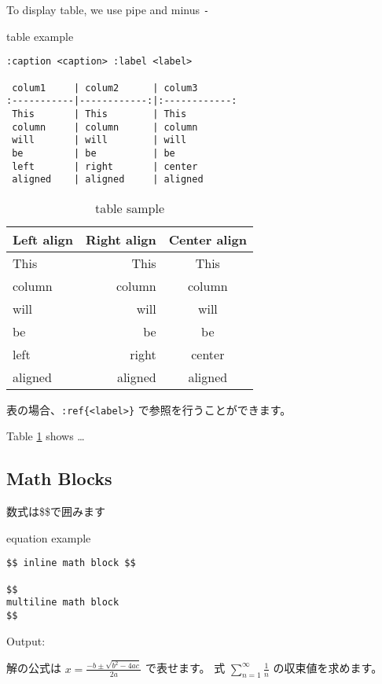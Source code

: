 \documentclass[a4j, titlepage]{jarticle}
\begin{document}
To display table, we use pipe {\tt \textbar{}} and minus {\tt -}

\begin{itembox}[c]{table example}
\begin{verbatim}
:caption <caption> :label <label>

 colum1     | colum2      | colum3
:-----------|------------:|:------------:
 This       | This        | This         
 column     | column      | column       
 will       | will        | will         
 be         | be          | be           
 left       | right       | center       
 aligned    | aligned     | aligned   
\end{verbatim}
\end{itembox}

\begin{table}[h]
\centering
\caption{table sample }
\label{table:1}
\begin{tabular}{|l|r|c|}
\hline
Left align & Right align & Center align\\
\hline
This & This & This\\
column & column & column\\
will & will & will\\
be & be & be\\
left & right & center\\
aligned & aligned & aligned\\
\hline
\end{tabular}
\end{table}

表の場合、{\tt :}{\tt ref\{\textless{}label\textgreater{}\}} で参照を行うことができます。

Table \ref{table:1} shows \ldots{}

\subsection{Math Blocks}

数式は\$\$で囲みます

\begin{itembox}[c]{equation example}
\begin{verbatim}
$$ inline math block $$

$$
multiline math block
$$
\end{verbatim}
\end{itembox}

Output:

解の公式は $x = \frac{-b\pm\sqrt{b^2-4ac}}{2a}$ で表せます。
式 $\sum_{n = 1}^{\infty} \frac{1}{n}$ の収束値を求めます。
\end{document}
